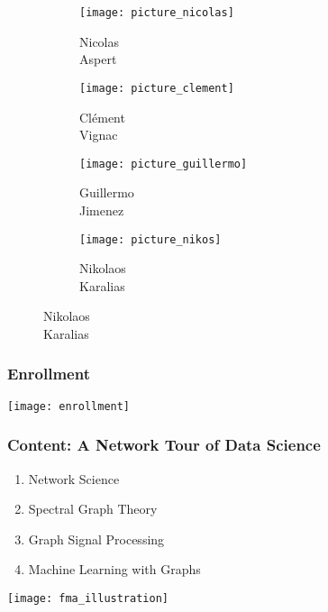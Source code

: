 \documentclass[aspectratio=169]{beamer}
\begin{document}
\begin{frame}
\begin{figure}
\begin{subfigure}[b]{0.14\linewidth}
			\texttt{[image: picture\_nicolas]}
			\caption*{Nicolas\\Aspert}
		\end{subfigure}
		\hfill
		\begin{subfigure}[b]{0.14\linewidth}
			\texttt{[image: picture\_clement]}
			\caption*{Clément\\Vignac}
		\end{subfigure}
		\hfill
		\begin{subfigure}[b]{0.14\linewidth}
			\texttt{[image: picture\_guillermo]}
			\caption*{Guillermo\\Jimenez}
		\end{subfigure}
		\hfill
		\begin{subfigure}[b]{0.14\linewidth}
			\texttt{[image: picture\_nikos]}
			\caption*{Nikolaos\\Karalias}
		\end{subfigure}
	\end{figure}
\end{frame}


\begin{frame}
	\frametitle{Enrollment}
	\centering
	\texttt{[image: enrollment]}
\end{frame}


\begin{frame}
	\frametitle{Content: \textbf{A Network Tour} of Data Science}
	\begin{minipage}{0.41\linewidth}
		\begin{enumerate}
			\item Network Science
			\vspace{2em}
			\item Spectral Graph Theory
			\vspace{2em}
			\item Graph Signal Processing
			\vspace{2em}
			\item Machine Learning with Graphs
		\end{enumerate}
	\end{minipage}
	\hfill
	\begin{minipage}{0.57\linewidth}
		\texttt{[image: fma\_illustration]}
	\end{minipage}
\end{frame}
\end{document}
